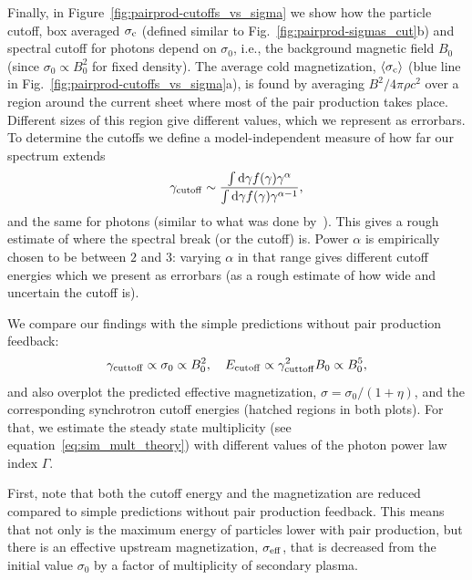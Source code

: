 Finally, in Figure~\ref{fig:pairprod-cutoffs_vs_sigma} we show how the particle cutoff, box averaged $\sigma_{\rm c}$ (defined similar to Fig.~\ref{fig:pairprod-sigmas_cut}b) and spectral cutoff for photons depend on $\sigma_0$, i.e., the background magnetic field $B_0$ (since $\sigma_0\propto B_0^2$ for fixed density). The average cold magnetization, $\langle \sigma_{\rm c}\rangle$ (blue line in Fig.~\ref{fig:pairprod-cutoffs_vs_sigma}a), is found by averaging $B^2/4\pi\rho c^2$ over a region around the current sheet where most of the pair production takes place. Different sizes of this region give different values, which we represent as errorbars. To determine the cutoffs we define a model-independent measure of how far our spectrum extends
\begin{equation}
    \gamma_{\rm cutoff}\sim \frac{\int\mathrm{d}\gamma f(\gamma)\gamma^\alpha}{\int\mathrm{d}\gamma f(\gamma)\gamma^{\alpha-1}},
\end{equation}
and the same for photons (similar to what was done by~\citealt{2015ApJ...809...55B}). This gives a rough estimate of where the spectral break (or the cutoff) is. Power $\alpha$ is empirically chosen to be between $2$ and $3$: varying $\alpha$ in that range gives different cutoff energies which we present as errorbars (as a rough estimate of how wide and uncertain the cutoff is).

We compare our findings with the simple predictions without pair production feedback:
\begin{equation}
    \gamma_{\rm cuttoff}\propto \sigma_0\propto B_0^2,~~~E_{\rm cutoff}\propto \gamma_{\rm cuttoff}^2 B_0\propto B_0^5,
\end{equation}
and also overplot the predicted effective magnetization, $\sigma=\sigma_0 / (1+\eta)$, and the corresponding synchrotron cutoff energies (hatched regions in both plots). For that, we estimate the steady state multiplicity (see equation~\ref{eq:sim_mult_theory}) with different values of the photon power law index $\Gamma$.

First, note that both the cutoff energy and the magnetization are reduced compared to simple predictions without pair production feedback. This means that not only is the maximum energy of particles lower with pair production, but there is an effective upstream magnetization, $\sigma_{\rm eff}$, that is decreased from the initial value $\sigma_0$ by a factor of multiplicity of secondary plasma.

